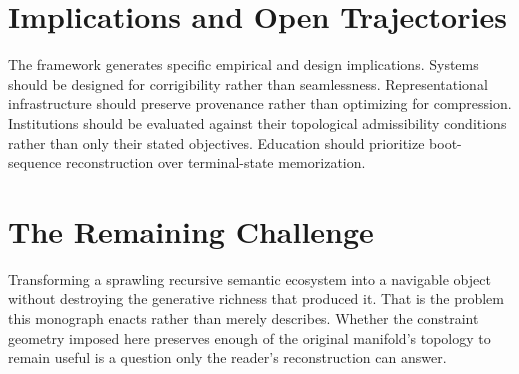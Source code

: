\section{Implications and Open Trajectories}

The framework generates specific empirical and design implications. Systems should
be designed for corrigibility rather than seamlessness. Representational
infrastructure should preserve provenance rather than optimizing for compression.
Institutions should be evaluated against their topological admissibility conditions
rather than only their stated objectives. Education should prioritize boot-sequence
reconstruction over terminal-state memorization.

\section{The Remaining Challenge}

Transforming a sprawling recursive semantic ecosystem into a navigable object
without destroying the generative richness that produced it. That is the problem
this monograph enacts rather than merely describes. Whether the constraint geometry
imposed here preserves enough of the original manifold's topology to remain useful
is a question only the reader's reconstruction can answer.
